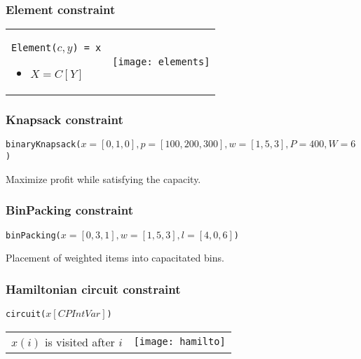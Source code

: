 \subsubsection{Element constraint}

\begin{tabular}{m{6cm}m{6cm}}
    \texttt{Element($c, y$) = x}
    \begin{itemize}
        \item $X = C[Y]$
    \end{itemize}
    &
    \texttt{[image: elements]}
\end{tabular}



\subsubsection{Knapsack constraint}
\begin{center}
    \texttt{binaryKnapsack($x=[0, 1, 0], p=[100, 200, 300], w=[1, 5, 3],
    P=400, W=6$)}
\end{center}
Maximize profit while satisfying the capacity.

\subsubsection{BinPacking constraint}
\begin{center}
    \texttt{binPacking($x=[0, 3, 1], w=[1, 5, 3], l=[4, 0, 6]$)}
\end{center}
Placement of weighted items into capacitated bins.

\subsubsection{Hamiltonian circuit constraint}
\begin{center}
    \texttt{circuit($x[CPIntVar]$)}
\end{center}

\begin{tabular}{m{5cm}m{10cm}}
$x(i)$ is visited after $i$
&
    \texttt{[image: hamilto]}
\end{tabular}


